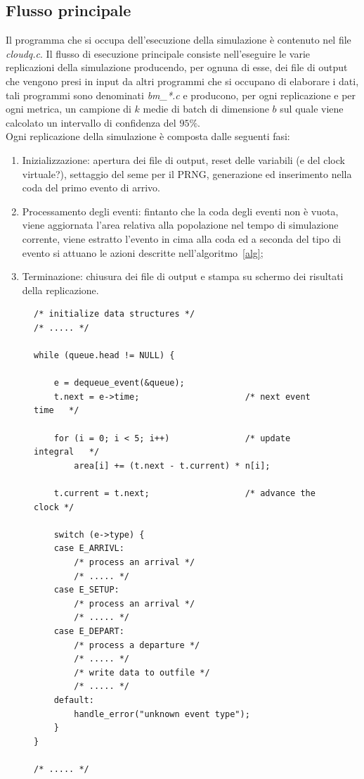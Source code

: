 \subsection{Flusso principale}
Il programma che si occupa dell’esecuzione della simulazione è contenuto nel
file \emph{cloudq.c}. Il flusso di esecuzione principale consiste nell’eseguire
le varie replicazioni della simulazione producendo, per ognuna di esse, dei file
di output che vengono presi in input da altri programmi che si occupano di
elaborare i dati, tali programmi sono denominati \emph{bm\_*.c} e producono, per
ogni replicazione e per ogni metrica, un campione di $k$ medie di batch di
dimensione $b$ sul quale viene calcolato un intervallo di confidenza del $95\%$.
\\Ogni replicazione della simulazione è composta dalle seguenti fasi:
%
\begin{enumerate}
\item Inizializzazione: apertura dei file di output, reset delle variabili (e
del clock virtuale?), settaggio del seme per il PRNG, generazione ed inserimento
nella coda del primo evento di arrivo.

\item Processamento degli eventi: fintanto che la coda degli eventi non è vuota,
viene aggiornata l’area relativa alla popolazione nel tempo di simulazione
corrente, viene estratto l’evento in cima alla coda ed a seconda del tipo di
evento si attuano le azioni descritte nell’algoritmo~\ref{alg};

\item Terminazione: chiusura dei file di output e stampa su schermo dei
risultati della replicazione.

\end{enumerate}
%
\begin{figure}[!h]
\begin{lstlisting}[title=cloudq.c]
/* initialize data structures */
/* ..... */

while (queue.head != NULL) { 

    e = dequeue_event(&queue);
    t.next = e->time;                     /* next event time   */

    for (i = 0; i < 5; i++)               /* update integral   */
        area[i] += (t.next - t.current) * n[i];

    t.current = t.next;                   /* advance the clock */

    switch (e->type) {
    case E_ARRIVL:              
        /* process an arrival */
        /* ..... */
    case E_SETUP:
        /* process an arrival */
        /* ..... */
    case E_DEPART: 
        /* process a departure */
        /* ..... */
        /* write data to outfile */
        /* ..... */
    default:
        handle_error("unknown event type");
    }
}

/* ..... */
\end{lstlisting}
\end{figure}
%
